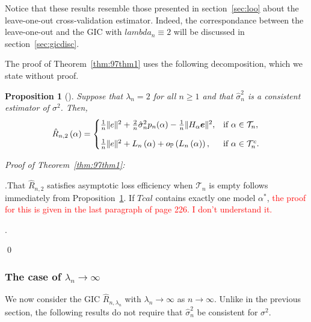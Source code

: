 \documentclass[11pt, letter paper]{article}
\newcommand{\1}{\mathmybb{1}}
\newtheorem{proposition}{Proposition}[section]
\newcommand{\0}{\emptyset}
\newcommand{\prob}{\mathbb{P}}
\newcommand{\paren}[1]{\left(#1 \right)}
\newcommand{\norm}[1]{|\hspace{-1pt}|#1 |\hspace{-1pt}|}
\newcommand{\normsq}[1]{\norm{#1}^{2}}
\newcommand{\Acal}{\mathcal{A}_{n}}
\newcommand{\Tcal}{\mathcal{T}_{n}}
\newcommand{\Ncal}{\mathcal{N}}
\newcommand{\e}{\boldsymbol{e}}
\newcommand{\Loss}[1]{L_{n}\paren{#1}}
\newcommand{\Rhat}[2]{\hat{R}_{n, #1}\paren{#2}}
\newcommand{\op}[1]{o_{\prob}\paren{#1}}
\newcommand{\sigmahat}{\hat{\sigma}^{2}_{n}}
\begin{document}

Notice that these results resemble those presented in section~{\ref{sec:loo}} about the leave-one-out cross-validation estimator. Indeed, the correspondance between the leave-one-out and the GIC with \(lambda_{n}\equiv 2\) will be discussed in section~{\ref{sec:gicdisc}}.

The proof of Theorem~\ref{thm:97thm1} uses the following decomposition, which we state without proof.

\begin{proposition}[\cite{shao_1997}]\label{prop:97decomp1}
    Suppose that \(\lambda_{n}=2\) for all \(n\geq 1\) and that \(\sigmahat\) is a consistent estimator of \(\sigma^{2}\). Then,
    \[\Rhat{2}{\alpha} = \begin{cases}
        \frac{1}{n}\normsq{e} + \frac{2}{n}\sigmahat p_{n}(\alpha) - \frac{1}{n}\normsq{H_{\alpha}\e}, &\text{if }\alpha\in\Tcal,\\[3mm]
        \frac{1}{n}\normsq{e} + \Loss{\alpha} + \op{\Loss{\alpha}}, &\text{if }\alpha\in\Tcal^{c}.
    \end{cases}\]
\end{proposition}

\begin{myproofbox}
    \textit{Proof of Theorem~\ref{thm:97thm1}: }

    .\quad That \(\hat{R}_{n,2}\) satisfies asymptotic loss efficiency when \(\Tcal\) is empty follows immediately from Proposition~\ref{prop:97decomp1}. If \(Tcal\) contains exactly one model \(\alpha^{*}\), \textcolor{red}{the proof for this is given in the last paragraph of page 226. I don't understand it.}
    
    .\quad 

    \qed{}
\end{myproofbox}

\subsubsection{The case of \(\lambda_{n} \to \infty\)}

We now consider the GIC \(\hat{R}_{n,\lambda_{n}}\) with \(\lambda_{n}\to\infty\) as \(n\to \infty\). Unlike in the previous section, the following results do not require that \(\sigmahat\) be consistent for \(\sigma^{2}\).
\end{document}
